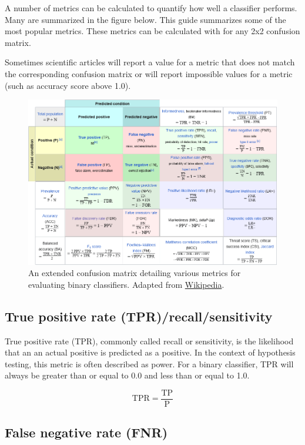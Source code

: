 \documentclass[letterpaper, 12pt]{article}
\begin{document}
A number of metrics can be calculated to quantify how well a classifier performs. Many are summarized in the figure below. This guide summarizes some of the most popular metrics. These metrics can be calculated with for any 2x2 confusion matrix. 

Sometimes scientific articles will report a value for a metric that does not match the corresponding confusion matrix or will report impossible values for a metric (such as accuracy score above 1.0).

\begin{figure}[h!tbp]
    \centering
    \includegraphics[width=\textwidth]{img/classifier_eval/extended_confusion_matrix.png}
    \caption*{An extended confusion matrix detailing various metrics for evaluating binary classifiers. Adapted from \href{https://en.wikipedia.org/wiki/Evaluation_of_binary_classifiers}{Wikipedia}.}
\end{figure}

\pagebreak

\subsection*{True positive rate (TPR)/recall/sensitivity}

True positive rate (TPR), commonly called recall or sensitivity, is the likelihood that an an actual positive is predicted as a positive. In the context of hypothesis testing, this metric is often described as power. For a binary classifier, TPR will always be greater than or equal to 0.0 and less than or equal to 1.0.

$$\textrm{TPR} = \frac{\textrm{TP}}{\textrm{P}}$$

\subsection*{False negative rate (FNR)}
\end{document}
